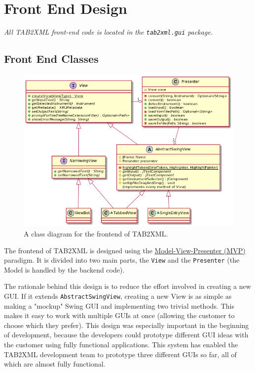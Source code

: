 \documentclass[11pt]{article}
\begin{document}
\section{Front End Design}
\label{sec:org740eb80}
\emph{All TAB2XML front-end code is located in the \texttt{tab2xml.gui} package.}
\subsection{Front End Classes}
\label{sec:orge288afc}
\begin{figure}[htbp]
\centering
\includegraphics[width=.9\linewidth]{./Diagrams/frontend-class-diagram.png}
\caption{A class diagram for the frontend of TAB2XML.}
\end{figure}

The frontend of TAB2XML is designed using the \href{https://en.wikipedia.org/wiki/Model\%E2\%80\%93view\%E2\%80\%93presenter}{Model-View-Presenter (MVP)} paradigm.  It is divided into two main parts, the \texttt{View} and the \texttt{Presenter} (the Model is handled by the backend code).

The rationale behind this design is to reduce the effort involved in creating a new GUI.  If it extends \texttt{AbstractSwingView}, creating a new View is as simple as making a "mockup" Swing GUI and implementing two trivial methods.  This makes it easy to work with multiple GUIs at once (allowing the customer to choose which they prefer).  This design was especially important in the beginning of development, because the developers could prototype different GUI ideas with the customer using fully functional applications.  This system has enabled the TAB2XML development team to prototype three different GUIs so far, all of which are almost fully functional.
\end{document}
